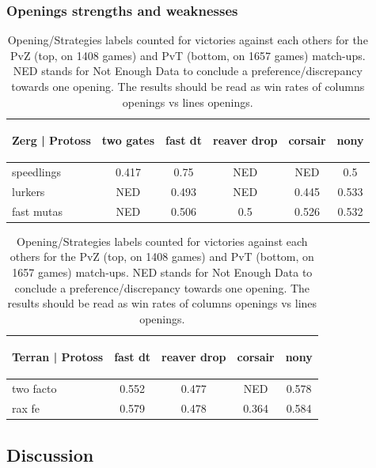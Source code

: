 \subsubsection{Openings strengths and weaknesses}

\begin{table}[ht] 
\begin{footnotesize}
\begin{center}
\begin{tabular}{|l|ccccc|}
\hline
\begin{tiny}Zerg | Protoss\end{tiny} & two gates & fast dt & reaver drop & corsair & nony\\
\hline
speedlings &  0.417& 0.75 & NED & NED & 0.5 \\
lurkers &  NED & 0.493& NED & 0.445 & 0.533\\
fast mutas &  NED & 0.506& 0.5 & 0.526& 0.532\\
\hline
\end{tabular}
\begin{tabular}{|l|cccc|}
\hline
\begin{tiny}Terran | Protoss\end{tiny} & fast dt & reaver drop & corsair & nony\\
\hline
two facto &  0.552& 0.477& NED & 0.578\\
rax fe &  0.579& 0.478& 0.364& 0.584\\
\hline
\end{tabular}
\caption{Opening/Strategies labels counted for victories against each others for the PvZ (top, on 1408 games) and PvT (bottom, on 1657 games) match-ups. NED stands for Not Enough Data to conclude a preference/discrepancy towards one opening. The results should be read as win rates of columns openings vs lines openings.}
\end{center}
\end{footnotesize}
\label{table:openingcontingency}
\end{table}


\subsection{Discussion}

